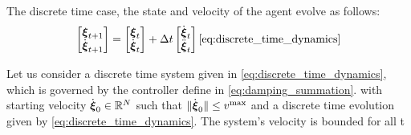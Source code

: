  The discrete time case, the state and velocity of the agent evolve as follows:
\begin{equation}
	\begin{bmatrix}
	 \boldsymbol{\xi}_{t+1} \\ \dot{\boldsymbol{\xi}}_{t+1}
	\end{bmatrix}
	=
	\begin{bmatrix}
	 \boldsymbol{\xi}_{t} \\ \dot{\boldsymbol{\xi}}_{t}
	\end{bmatrix}
	+ 
	\Delta t 
	\begin{bmatrix}
		\dot{\boldsymbol{\xi}}_{t} \\ \ddot{\boldsymbol{\xi}}_t 
	\end{bmatrix}
	\eqref{eq:discrete_time_dynamics}
\end{equation}

\begin{lemma}
	Let us consider a discrete time system given in \eqref{eq:discrete_time_dynamics}, which is governed by the controller define in \eqref{eq:damping_summation}.
	with starting velocity $\dot{\boldsymbol{\xi}}_0 \in \mathbb{R}^N$ such that $\| \dot{\boldsymbol{\xi}}_0\| \leq v^{\mathrm{max}}$ and a discrete time evolution given by \eqref{eq:discrete_time_dynamics}. The system's velocity is bounded for all t 
\end{lemma}

